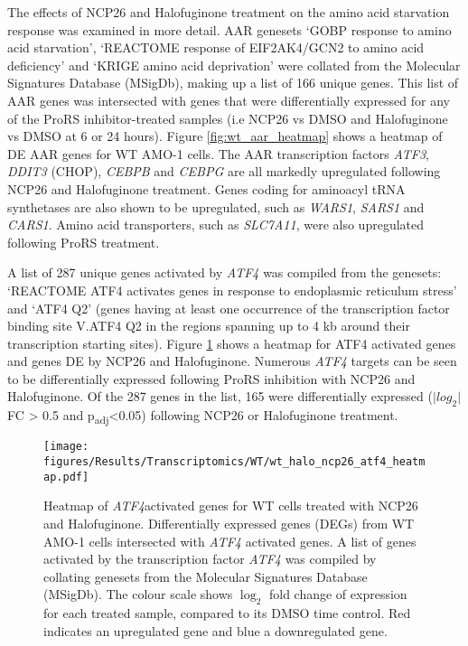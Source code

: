 The effects of NCP26 and Halofuginone treatment on the amino acid starvation response was examined in more detail.
AAR genesets `GOBP response to amino acid starvation', `REACTOME response of EIF2AK4/GCN2 to amino acid deficiency' and `KRIGE amino acid deprivation' were collated from the Molecular Signatures Database (MSigDb), making up a list of 166 unique genes.
This list of AAR genes was intersected with genes that were differentially expressed for any of the ProRS inhibitor-treated samples (i.e NCP26 vs DMSO and Halofuginone vs DMSO at 6 or 24 hours).
Figure \ref{fig:wt_aar_heatmap} shows a heatmap of DE AAR genes for WT AMO-1 cells.
The AAR transcription factors \textit{ATF3}, \textit{DDIT3} (CHOP), \textit{CEBPB} and \textit{CEBPG} are all markedly upregulated following NCP26 and Halofuginone treatment.
Genes coding for aminoacyl tRNA synthetases are also shown to be upregulated, such as \textit{WARS1}, \textit{SARS1} and \textit{CARS1}.
Amino acid transporters, such as \textit{SLC7A11}, were also upregulated following ProRS treatment.

A list of 287 unique genes activated by \textit{ATF4} was compiled from the genesets: `REACTOME ATF4 activates genes in response to endoplasmic reticulum stress' and `ATF4 Q2' (genes having at least one occurrence of the transcription factor binding site V.ATF4 Q2 in the regions spanning up to 4 kb around their transcription starting sites).
Figure \ref{fig:wt_atf4_heatmap} shows a heatmap for ATF4 activated genes and genes DE by NCP26 and Halofuginone.
Numerous \textit{ATF4} targets can be seen to be differentially expressed following ProRS inhibition with NCP26 and Halofuginone.
Of the 287 genes in the list, 165 were differentially expressed ($\lvert log_{2} \rvert$FC > 0.5 and p\textsubscript{adj}<0.05) following NCP26 or Halofuginone treatment.


\begin{figure}[p]
\centering
\texttt{[image: figures/Results/Transcriptomics/WT/wt\_halo\_ncp26\_atf4\_heatmap.pdf]}
\caption[Heatmap of \textit{ATF4} activated genes for ProRS treated WT cells]{Heatmap of \textit{ATF4}activated genes for WT cells treated with NCP26 and Halofuginone.
Differentially expressed genes (DEGs) from WT AMO-1 cells intersected with \textit{ATF4} activated genes.
A list of genes activated by the transcription factor \textit{ATF4} was compiled by collating genesets from the Molecular Signatures Database (MSigDb).
The colour scale shows $\log_{2}$ fold change of expression for each treated sample, compared to its DMSO time control.
Red indicates an upregulated gene and blue a downregulated gene.
}
\label{fig:wt_atf4_heatmap}
\end{figure}

